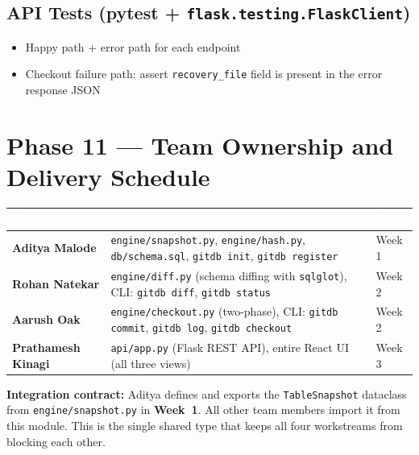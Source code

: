 \documentclass[12pt, a4paper]{article}
\begin{document}
\subsection{API Tests (pytest + \texttt{flask.testing.FlaskClient})}

\begin{itemize}[leftmargin=1.5em, itemsep=0.3em]
    \item Happy path + error path for each endpoint
    \item Checkout failure path: assert \texttt{recovery\_file} field is
    present in the error response JSON
\end{itemize}

\section{Phase 11 --- Team Ownership and Delivery Schedule}

\renewcommand{\arraystretch}{1.5}
\begin{tabularx}{\textwidth}{>{\bfseries}p{3.8cm} X >{\centering\arraybackslash}p{2cm}}
\rowcolor{tableheader}
\textcolor{white}{\normalfont\bfseries Member} &
\textcolor{white}{\normalfont\bfseries Owns} &
\textcolor{white}{\normalfont\bfseries By} \\
\midrule
Aditya Malode
    & \texttt{engine/snapshot.py}, \texttt{engine/hash.py},
      \texttt{db/schema.sql}, \texttt{gitdb init},
      \texttt{gitdb register}
    & Week 1 \\
\rowcolor{lightgray}
Rohan Natekar
    & \texttt{engine/diff.py} (schema diffing with \texttt{sqlglot}),
      CLI: \texttt{gitdb diff}, \texttt{gitdb status}
    & Week 2 \\
Aarush Oak
    & \texttt{engine/checkout.py} (two-phase),
      CLI: \texttt{gitdb commit}, \texttt{gitdb log},
      \texttt{gitdb checkout}
    & Week 2 \\
\rowcolor{lightgray}
Prathamesh Kinagi
    & \texttt{api/app.py} (Flask REST API),
      entire React UI (all three views)
    & Week 3 \\
\end{tabularx}

\vspace{1em}

\begin{tcolorbox}[fixbox]
\textbf{Integration contract:} Aditya defines and exports the
\texttt{TableSnapshot} dataclass from \texttt{engine/snapshot.py} in
\textbf{Week~1}. All other team members import it from this module. This is
the single shared type that keeps all four workstreams from blocking each
other.
\end{tcolorbox}
\end{document}
